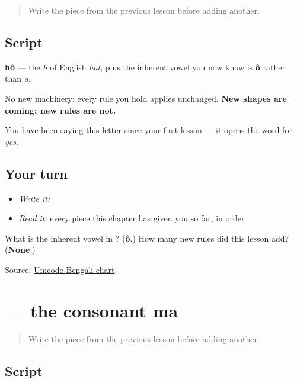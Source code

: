 \begin{quote}
Write the piece from the previous lesson before adding another.
\end{quote}

\subsection*{Script}
\begin{quote}
\end{quote}

\textbf{hô} — the \emph{h} of English \emph{hat}, plus the inherent vowel you now know is \textbf{ô} rather than \emph{a}.

No new machinery: every rule you hold applies unchanged. \textbf{New shapes are coming; new rules are not.}

You have been saying this letter since your first lesson — it opens the word for \emph{yes}.

\subsection*{Your turn}
\begin{itemize}
\raggedright
  \item \emph{Write it:} 
  \item \emph{Read it:} every piece this chapter has given you so far, in order
\end{itemize}

\begin{tcolorbox}[breakable,colback=teal!4,colframe=teal!35!black,title={Before you move on}]
What is the inherent vowel in \textbf{}? (\textbf{ô}.) How many new rules did this lesson add? (\textbf{None}.)

Source: \href{https://www.unicode.org/charts/PDF/U0980.pdf}{Unicode Bengali chart}.
\end{tcolorbox}
\section[mô]{ — the consonant ma}

\label{lesson:BN-W01-ma}



\begin{quote}
Write the piece from the previous lesson before adding another.
\end{quote}

\subsection*{Script}
\begin{quote}
\end{quote}

